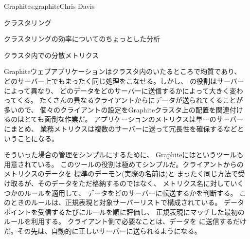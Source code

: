 \begin{aosachapter}{Graphite}{s:graphite}{Chris Davis}
\begin{aosasect1}{クラスタリング}
\begin{aosasect2}{クラスタリングの効率についてのちょっとした分析}
\end{aosasect2}

\begin{aosasect2}{クラスタ内での分散メトリクス}

Graphiteウェブアプリケーションはクラスタ内のいたるところで均質であり、
どのサーバー上でもまったく同じ処理をこなせる。しかし、
の役割はサーバーによって異なり、
どのデータをどのサーバーに送信するかによって大きく変わってくる。
たくさんの異なるクライアントからにデータが送られてくることが多いので、
個々のクライアントの設定をGraphiteクラスタ上の配置を関連付けるのはとても面倒な作業だ。
アプリケーションのメトリクスは単一のサーバーにまとめ、
業務メトリクスは複数のサーバーに送って冗長性を確保するなどということになる。

そういった場合の管理をシンプルにするために、
Graphiteにはというツールも用意されている。
このツールの役割は極めてシンプルだ。クライアントからのメトリクスのデータを
標準のデーモン(実際の名前は)と
まったく同じ方法で受け取るが、そのデータをただ格納するのではなく、
メトリクス名に対していくつかのルールを適用して、
データをどのサーバーに転送するかを判断する。
このときのルールは、正規表現と対象サーバーリストで構成されている。
データポイントを受信するたびにルールを順に評価し、
正規表現にマッチした最初のルールを利用する。
クライアント側で必要なことは、データを
に送信するだけだ。その先は、自動的に正しいサーバーに送られるようになる。


\end{aosasect2}
\end{aosasect1}
\end{aosachapter}
